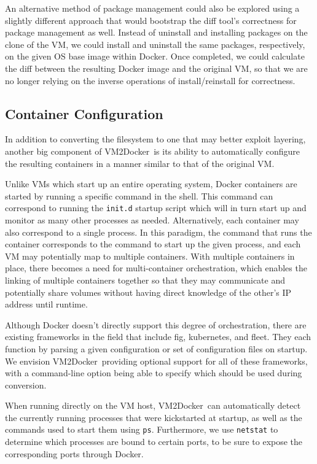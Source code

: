 \documentclass[\myfontsize, letterpaper]{article}
\newcommand{\projectname}{VM2Docker}
\begin{document}
An alternative method of package management could also be explored using a slightly different approach that would bootstrap the diff tool's correctness for package management as well. Instead of uninstall and installing packages on the clone of the VM, we could install and uninstall the same packages, respectively, on the given OS base image within Docker. Once completed, we could calculate the diff between the resulting Docker image and the original VM, so that we are no longer relying on the inverse operations of install/reinstall for correctness. 

\subsection{Container Configuration}
In addition to converting the filesystem to one that may better exploit layering, another big component of \projectname\ is its ability to automatically configure the resulting containers in a manner similar to that of the original VM.

Unlike VMs which start up an entire operating system, Docker containers are started by running a specific command in the shell. This command can correspond to running the \texttt{init.d} startup script which will in turn start up and monitor as many other processes as needed. Alternatively, each container may also correspond to a single process. In this paradigm, the command that runs the container corresponds to the command to start up the given process, and each VM may potentially map to multiple containers. With multiple containers in place, there becomes a need for multi-container orchestration, which enables the linking of multiple containers together so that they may communicate and potentially share volumes without having direct knowledge of the other's IP address until runtime. 

Although Docker doesn't directly support this degree of orchestration, there are existing frameworks in the field that include fig\cite{fig}, kubernetes\cite{kubernetes}, and fleet\cite{fleet}. They each function by parsing a given configuration or set of configuration files on startup. We envision \projectname\ providing optional support for all of these frameworks, with a command-line option being able to specify which should be used during conversion.

When running directly on the VM host, \projectname\ can automatically detect the currently running processes that were kickstarted at startup, as well as the commands used to start them using \texttt{ps}. Furthermore, we use \texttt{netstat} to determine which processes are bound to certain ports, to be sure to expose the corresponding ports through Docker.
\end{document}

